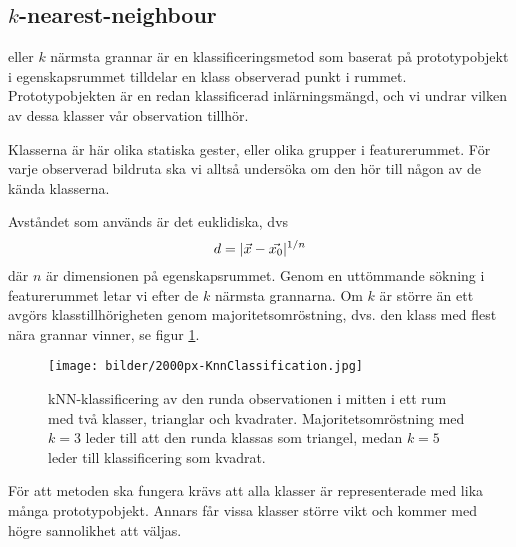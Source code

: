 \documentclass[../rapport_MVEX01-11-05]{subfiles}
\begin{document}
\subsection{$k$-nearest-neighbour}\label{sec:knn}

\knn eller $k$ närmsta grannar är en klassificeringsmetod som baserat på
prototypobjekt i egenskapsrummet tilldelar en klass observerad punkt i rummet.
Prototypobjekten är en redan klassificerad inlärningsmängd, och vi undrar vilken
av dessa klasser vår observation tillhör.

Klasserna är här olika statiska gester, eller olika grupper i featurerummet. För varje observerad bildruta ska vi alltså undersöka om den hör till någon av de kända klasserna.

Avståndet som används är det euklidiska, dvs
\begin{equation*}
    d = |\vec{x}-\vec{x_0}|^{1/n}
\end{equation*}
där $n$ är dimensionen på egenskapsrummet. Genom en uttömmande sökning i featurerummet letar vi efter de $k$ närmsta grannarna. Om $k$ är större än ett avgörs klasstillhörigheten genom majoritetsomröstning, dvs. den klass med flest nära grannar vinner, se figur \ref{fig:knn-overview}.

\begin{figure}[!htb]
    \begin{center}
\texttt{[image: bilder/2000px-KnnClassification.jpg]}
    \end{center}
    \caption{kNN-klassificering av den runda observationen i mitten i ett rum
    med två klasser, trianglar och kvadrater. Majoritetsomröstning
    med $k=3$ leder till att den runda klassas som triangel, medan $k=5$ leder
    till klassificering som kvadrat.}
    \label{fig:knn-overview}
\end{figure}

För att metoden ska fungera krävs att alla klasser är representerade med lika många prototypobjekt. Annars får vissa klasser större vikt och kommer med högre sannolikhet att väljas.


%

\end{document}

